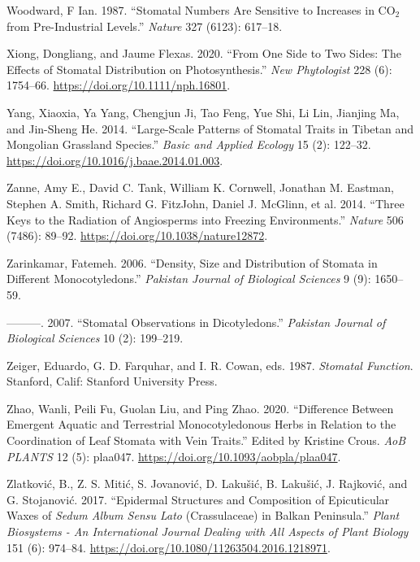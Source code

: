 \documentclass[
  12pt,
]{article}
\newlength{\cslhangindent}
\newlength{\cslentryspacingunit} %
\newenvironment{CSLReferences}[2] %
 {%
  \setlength{\parindent}{0pt}
  \ifodd #1
  \let\oldpar\par
  \def\par{\hangindent=\cslhangindent\oldpar}
  \fi
  \setlength{\parskip}{#2\cslentryspacingunit}
 }%
 {}
\begin{document}
\begin{CSLReferences}{1}{0}
\leavevmode{}%
Woodward, F Ian. 1987. {``Stomatal Numbers Are Sensitive to Increases in {CO}\(_{\textrm{2}}\) from Pre-Industrial Levels.''} \emph{Nature} 327 (6123): 617--18.

\leavevmode{}%
Xiong, Dongliang, and Jaume Flexas. 2020. {``From One Side to Two Sides: The Effects of Stomatal Distribution on Photosynthesis.''} \emph{New Phytologist} 228 (6): 1754--66. \url{https://doi.org/10.1111/nph.16801}.

\leavevmode{}%
Yang, Xiaoxia, Ya Yang, Chengjun Ji, Tao Feng, Yue Shi, Li Lin, Jianjing Ma, and Jin-Sheng He. 2014. {``Large-Scale Patterns of Stomatal Traits in {Tibetan} and {Mongolian} Grassland Species.''} \emph{Basic and Applied Ecology} 15 (2): 122--32. \url{https://doi.org/10.1016/j.baae.2014.01.003}.

\leavevmode{}%
Zanne, Amy E., David C. Tank, William K. Cornwell, Jonathan M. Eastman, Stephen A. Smith, Richard G. FitzJohn, Daniel J. McGlinn, et al. 2014. {``Three Keys to the Radiation of Angiosperms into Freezing Environments.''} \emph{Nature} 506 (7486): 89--92. \url{https://doi.org/10.1038/nature12872}.

\leavevmode{}%
Zarinkamar, Fatemeh. 2006. {``Density, Size and Distribution of Stomata in Different Monocotyledons.''} \emph{Pakistan Journal of Biological Sciences} 9 (9): 1650--59.

\leavevmode{}%
---------. 2007. {``Stomatal Observations in Dicotyledons.''} \emph{Pakistan Journal of Biological Sciences} 10 (2): 199--219.

\leavevmode{}%
Zeiger, Eduardo, G. D. Farquhar, and I. R. Cowan, eds. 1987. \emph{Stomatal Function}. Stanford, Calif: Stanford University Press.

\leavevmode{}%
Zhao, Wanli, Peili Fu, Guolan Liu, and Ping Zhao. 2020. {``Difference Between Emergent Aquatic and Terrestrial Monocotyledonous Herbs in Relation to the Coordination of Leaf Stomata with Vein Traits.''} Edited by Kristine Crous. \emph{AoB PLANTS} 12 (5): plaa047. \url{https://doi.org/10.1093/aobpla/plaa047}.

\leavevmode{}%
Zlatković, B., Z. S. Mitić, S. Jovanović, D. Lakušić, B. Lakušić, J. Rajković, and G. Stojanović. 2017. {``Epidermal Structures and Composition of Epicuticular Waxes of \emph{{Sedum} Album Sensu Lato} ({Crassulaceae}) in {Balkan} {Peninsula}.''} \emph{Plant Biosystems - An International Journal Dealing with All Aspects of Plant Biology} 151 (6): 974--84. \url{https://doi.org/10.1080/11263504.2016.1218971}.


\end{CSLReferences}
\end{document}
